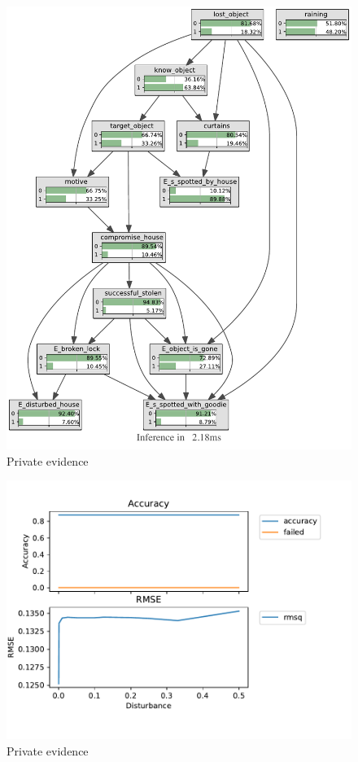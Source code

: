 \begin{figure}[h!]
\begin{center}
\includegraphics[width=\linewidth]{../experiments/StolenLaptopPrivate/bnImage/BNIMAGEStolenLaptopPrivate.pdf}
\caption{Private evidence}
\label{privatelaptopperformance}
\end{center}
\end{figure}

\begin{figure}[h!]
\begin{center}
\includegraphics[width=\linewidth]{../experiments/StolenLaptopPrivate/plots/performance_StolenLaptopPrivate.pdf}
\caption{Private evidence}
\label{privatelaptopperformance}
\end{center}
\end{figure}

